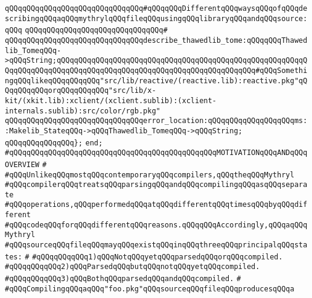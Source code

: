 \newline
\verb|qQQqqQQqqQQqqQQqqQQqqQQqqQQqqQQq#qQQqqQQqDifferentqQQqwaysqQQqofqQQqdescribingqQQqaqQQqmythrylqQQqfileqQQqusingqQQqlibraryqQQqandqQQqsource:qQQq|\newline
\verb|qQQqqQQqqQQqqQQqqQQqqQQqqQQqqQQq#|\newline
\verb|qQQqqQQqqQQqqQQqqQQqqQQqqQQqqQQqdescribe_thawedlib_tome:qQQqqQQqThawedlib_TomeqQQq->qQQqString;qQQqqQQqqQQqqQQqqQQqqQQqqQQqqQQqqQQqqQQqqQQqqQQqqQQqqQQqqQQqqQQqqQQqqQQqqQQqqQQqqQQqqQQqqQQqqQQqqQQqqQQqqQQqqQQqqQQq#qQQqSomethingqQQqlikeqQQqqQQqqQQq"src/lib/reactive/(reactive.lib):reactive.pkg"qQQqqQQqqQQqorqQQqqQQqqQQq"src/lib/x-kit/(xkit.lib):xclient/(xclient.sublib):(xclient-internals.sublib):src/color/rgb.pkg"|\newline
\newline
\verb|qQQqqQQqqQQqqQQqqQQqqQQqqQQqqQQqerror_location:qQQqqQQqqQQqqQQqqQQqms::Makelib_StateqQQq->qQQqThawedlib_TomeqQQq->qQQqString;|\newline
\verb|qQQqqQQqqQQqqQQq};|\newline
\verb|end;|\newline
\newline
\verb|#qQQqqQQqqQQqqQQqqQQqqQQqqQQqqQQqqQQqqQQqqQQqqQQqMOTIVATIONqQQqANDqQQqOVERVIEW|\newline
\verb|#|\newline
\verb|#qQQqUnlikeqQQqmostqQQqcontemporaryqQQqcompilers,qQQqtheqQQqMythryl|\newline
\verb|#qQQqcompilerqQQqtreatsqQQqparsingqQQqandqQQqcompilingqQQqasqQQqseparate|\newline
\verb|#qQQqoperations,qQQqperformedqQQqatqQQqdifferentqQQqtimesqQQqbyqQQqdifferent|\newline
\verb|#qQQqcodeqQQqforqQQqdifferentqQQqreasons.qQQqqQQqAccordingly,qQQqaqQQqMythryl|\newline
\verb|#qQQqsourceqQQqfileqQQqmayqQQqexistqQQqinqQQqthreeqQQqprincipalqQQqstates:|\newline
\verb|#|\newline
\verb|#qQQqqQQqqQQq1)qQQqNotqQQqyetqQQqparsedqQQqorqQQqcompiled.|\newline
\verb|#qQQqqQQqqQQq2)qQQqParsedqQQqbutqQQqnotqQQqyetqQQqcompiled.|\newline
\verb|#qQQqqQQqqQQq3)qQQqBothqQQqparsedqQQqandqQQqcompiled.|\newline
\verb|#|\newline
\verb|#qQQqCompilingqQQqaqQQq"foo.pkg"qQQqsourceqQQqfileqQQqproducesqQQqa|\newline
